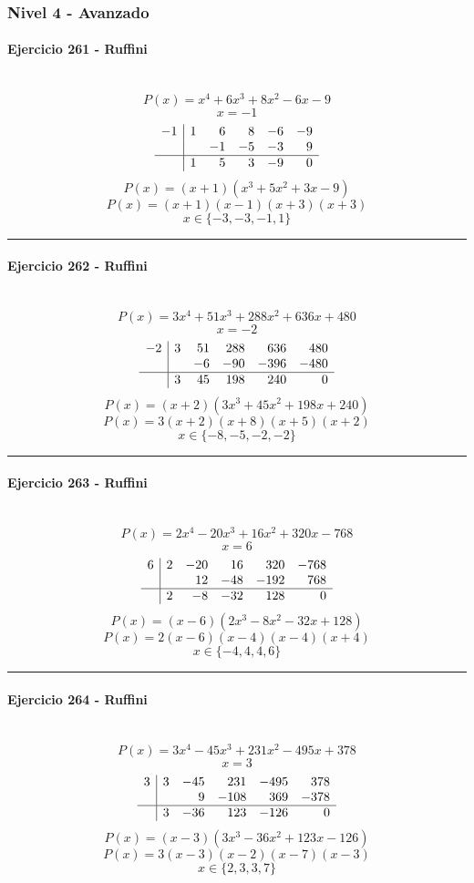 \documentclass[10pt,a4paper]{article}
\newcommand{\res}[1]{\paragraph{#1}\mbox{}\\[-1.2em]}
\begin{document}
\subsubsection*{Nivel 4 - Avanzado}
\res{Ejercicio 261 - Ruffini}
\[ P(x)=x^{4} + 6 x^{3} + 8 x^{2} - 6 x - 9 \]
\[ x=-1 \]
\[\begin{array}{r|rrrrr}-1 & 1 & 6 & 8 & -6 & -9\\  &  & -1 & -5 & -3 & 9\\\hline  & 1 & 5 & 3 & -9 & 0\end{array}\]
\[ P(x)=(x+1)(x^{3} + 5 x^{2} + 3 x - 9) \]
\[ P(x)=(x+1)(x-1)(x+3)(x+3) \]
\[ \boxed{x\in\{-3,-3,-1,1\}} \]
\vspace{1mm}\hrule\vspace{2mm}
\res{Ejercicio 262 - Ruffini}
\[ P(x)=3 x^{4} + 51 x^{3} + 288 x^{2} + 636 x + 480 \]
\[ x=-2 \]
\[\begin{array}{r|rrrrr}-2 & 3 & 51 & 288 & 636 & 480\\  &  & -6 & -90 & -396 & -480\\\hline  & 3 & 45 & 198 & 240 & 0\end{array}\]
\[ P(x)=(x+2)(3 x^{3} + 45 x^{2} + 198 x + 240) \]
\[ P(x)=3(x+2)(x+8)(x+5)(x+2) \]
\[ \boxed{x\in\{-8,-5,-2,-2\}} \]
\vspace{1mm}\hrule\vspace{2mm}
\res{Ejercicio 263 - Ruffini}
\[ P(x)=2 x^{4} - 20 x^{3} + 16 x^{2} + 320 x - 768 \]
\[ x=6 \]
\[\begin{array}{r|rrrrr}6 & 2 & -20 & 16 & 320 & -768\\  &  & 12 & -48 & -192 & 768\\\hline  & 2 & -8 & -32 & 128 & 0\end{array}\]
\[ P(x)=(x-6)(2 x^{3} - 8 x^{2} - 32 x + 128) \]
\[ P(x)=2(x-6)(x-4)(x-4)(x+4) \]
\[ \boxed{x\in\{-4,4,4,6\}} \]
\vspace{1mm}\hrule\vspace{2mm}
\res{Ejercicio 264 - Ruffini}
\[ P(x)=3 x^{4} - 45 x^{3} + 231 x^{2} - 495 x + 378 \]
\[ x=3 \]
\[\begin{array}{r|rrrrr}3 & 3 & -45 & 231 & -495 & 378\\  &  & 9 & -108 & 369 & -378\\\hline  & 3 & -36 & 123 & -126 & 0\end{array}\]
\[ P(x)=(x-3)(3 x^{3} - 36 x^{2} + 123 x - 126) \]
\[ P(x)=3(x-3)(x-2)(x-7)(x-3) \]
\[ \boxed{x\in\{2,3,3,7\}} \]
\end{document}

